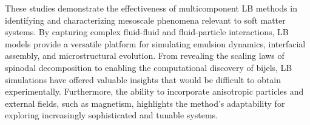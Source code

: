 These studies demonstrate the effectiveness of multicomponent LB methods in identifying and characterizing mesoscale phenomena relevant to soft matter systems. By capturing 
complex fluid-fluid and fluid-particle interactions, LB models provide a versatile platform for simulating emulsion dynamics, interfacial assembly, and 
microstructural evolution. From revealing the scaling laws of spinodal decomposition to enabling the computational discovery of bijels, LB simulations have offered valuable insights that would be 
difficult to obtain experimentally. Furthermore, the ability to incorporate anisotropic particles and external fields, such as magnetism, highlights the method's adaptability for exploring 
increasingly sophisticated and tunable systems. 